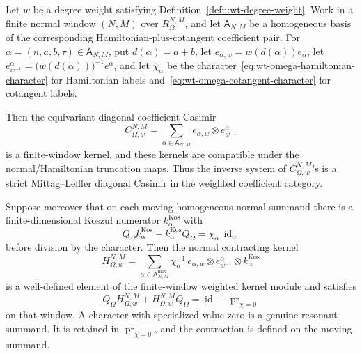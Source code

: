 \begin{thm}\label{thm:wt-omega-kernel-admissibility}
  Let \(w\) be a degree weight satisfying
  Definition~\ref{defn:wt-degree-weight}.  Work in a finite normal window
  \((N,M)\) over \(R_{\Omega}^{N,M}\), and let
  \(\mathsf A_{N,M}\) be a homogeneous basis of the corresponding
  Hamiltonian-plus-cotangent coefficient pair.  For
  \(\alpha=(n,a,b,\tau)\in\mathsf A_{N,M}\), put
  \(d(\alpha)=a+b\), let \(e_{\alpha,w}=w(d(\alpha))e_\alpha\), let
  \(e^\alpha_{w^{-1}}=\bigl(w(d(\alpha))\bigr)^{-1}e^\alpha\), and let
  \(\chi_\alpha\) be the character~\eqref{eq:wt-omega-hamiltonian-character}
  for Hamiltonian labels and~\eqref{eq:wt-omega-cotangent-character} for
  cotangent labels.

  Then the equivariant diagonal coefficient Casimir
  \begin{equation}\label{eq:wt-omega-casimir}
    C_{\Omega,w}^{N,M}
      =
    \sum_{\alpha\in\mathsf A_{N,M}}
      e_{\alpha,w}\otimes e^\alpha_{w^{-1}}
  \end{equation}
  is a finite-window kernel, and these kernels are compatible under the
  normal/Hamiltonian truncation maps.  Thus the inverse system of
  \(C_{\Omega,w}^{N,M}\)'s is a strict Mittag--Leffler diagonal Casimir in
  the weighted coefficient category.

  Suppose moreover that on each moving homogeneous normal summand there is
  a finite-dimensional Koszul numerator \(k^{\mathrm{Kos}}_\alpha\) with
  \[
    Q_\Omega k^{\mathrm{Kos}}_\alpha
      +k^{\mathrm{Kos}}_\alpha Q_\Omega
      =
    \chi_\alpha\,\operatorname{id}_\alpha
  \]
  before division by the character.  Then the normal contracting kernel
  \begin{equation}\label{eq:wt-omega-normal-kernel}
    H_{\Omega,w}^{N,M}
      =
    \sum_{\alpha\in\mathsf A^{\mathrm{mov}}_{N,M}}
      \chi_\alpha^{-1}\,
      e_{\alpha,w}\otimes e^\alpha_{w^{-1}}\otimes
      k^{\mathrm{Kos}}_\alpha
  \end{equation}
  is a well-defined element of the finite-window weighted kernel module and
  satisfies
  \[
    Q_\Omega H_{\Omega,w}^{N,M}
      +H_{\Omega,w}^{N,M}Q_\Omega
      =
    \operatorname{id}-\operatorname{pr}_{\chi=0}
  \]
  on that window.  A character with specialized value zero is a genuine
  resonant summand.  It is retained in
  \(\operatorname{pr}_{\chi=0}\), and the contraction is defined on the
  moving summand.


\end{thm}
